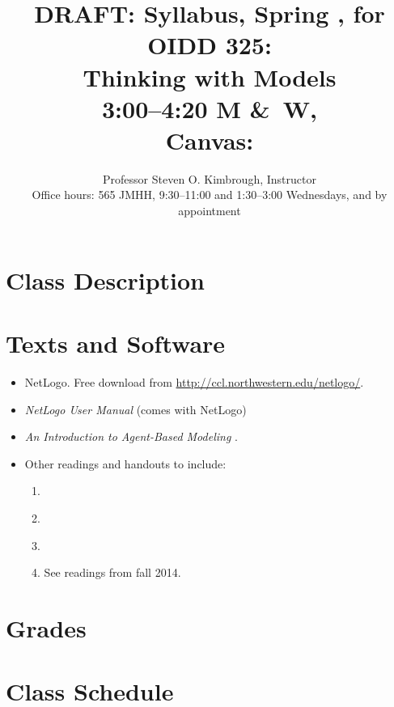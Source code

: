 \documentclass[11pt]{article}
\title{{\color{red} DRAFT:} Syllabus, Spring \year , for OIDD 325:  \\
Thinking with Models \\
		   3:00--4:20 M \&\ W, \place \\
		   Canvas: \canvas  %
		   }
\author{Professor Steven O. Kimbrough, Instructor  \\
Office hours: 565 JMHH, 9:30--11:00  and 1:30--3:00 Wednesdays, and by appointment}
\begin{document}
\maketitle


\section{Class Description}

\section{Texts and Software}


\begin{itemize}
\item NetLogo. Free download from \url{http://ccl.northwestern.edu/netlogo/}.



\item  {\it NetLogo User Manual} (comes with NetLogo)

\item {\it An Introduction to Agent-Based Modeling}
\citep{wilensky_rand_2015}.

\item Other readings and handouts to include:
\begin{enumerate}
\item \citet{bankes_1993}
\item \citet{bankes_lempert_popper_2002}
\item \citet[chapters 1 and 2]{weisberg_2013}
\item See readings from fall 2014.
\end{enumerate}
\end{itemize}
\section{Grades}



\section{Class Schedule}
\end{document}
